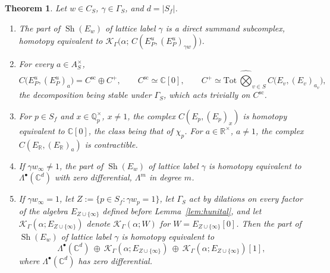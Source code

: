 \documentclass[11pt]{amsart}
\newtheorem{theorem}{Theorem}[section]
\theoremstyle{definition}
\theoremstyle{remark}
\newcommand{\C}{\mathbb C}
\newcommand{\R}{\mathbb R}
\newcommand{\Q}{\mathbb Q}
\newcommand{\Sh}{\operatorname{Sh}}
\begin{document}
\begin{theorem}\label{thm:shadow}
Let $w\in C_S$, $\gamma\in\Gamma_S$, and $d=|S_f|$.
\begin{enumerate}
\item[(a)] The part of $\Sh(E_w)$ of lattice label $\gamma$ is a direct
summand subcomplex, homotopy equivalent to
$\mathcal K_{\Gamma}\bigl(\alpha;\,C(E_P^{u},(E_P^{u})_{\gamma w})\bigr)$.
\item[(b)] For every $a\in A_S^{\times}$,
\[
C\bigl(E_P^{u},(E_P^{u})_{a}\bigr)=C^{\mathrm{sc}}\oplus C^{+},\qquad
C^{\mathrm{sc}}\simeq\C[0],\qquad
C^{+}\simeq\mathrm{Tot}\,\widehat\bigotimes_{v\in S}C\bigl(E_v,(E_v)_{a_v}\bigr),
\]
the decomposition being stable under $\Gamma_S$, which acts trivially on
$C^{\mathrm{sc}}$.
\item[(c)] For $p\in S_f$ and $x\in\Q_p^{\times}$, $x\ne1$, the complex
$C(E_p,(E_p)_{x})$ is homotopy equivalent to $\C[0]$, the class being that of
$\chi_p$.  For $a\in\R^{\times}$, $a\ne1$, the complex $C(E_{\R},(E_{\R})_{a})$
is contractible.
\item[(d)] If $\gamma w_{\infty}\ne1$, the part of $\Sh(E_w)$ of lattice label
$\gamma$ is homotopy equivalent to $\Lambda^{\bullet}(\C^{d})$ with zero
differential, $\Lambda^{m}$ in degree $m$.
\item[(e)] If $\gamma w_{\infty}=1$, let $Z:=\{p\in S_f:\gamma w_p=1\}$, let
$\Gamma_S$ act by dilations on every factor of the algebra
$E_{Z\cup\{\infty\}}$ defined before Lemma~\ref{lem:hunital}, and let
$\mathcal K_{\Gamma}(\alpha;E_{Z\cup\{\infty\}})$ denote
$\mathcal K_{\Gamma}(\alpha;W)$ for $W=E_{Z\cup\{\infty\}}[0]$.  Then the part of
$\Sh(E_w)$ of lattice label $\gamma$ is homotopy equivalent to
\[
\Lambda^{\bullet}(\C^{d})\ \oplus\ \mathcal K_{\Gamma}(\alpha;E_{Z\cup\{\infty\}})\ \oplus\
\mathcal K_{\Gamma}(\alpha;E_{Z\cup\{\infty\}})[1],
\]
where $\Lambda^{\bullet}(\C^{d})$ has zero differential.
\end{enumerate}
\end{theorem}
\end{document}
